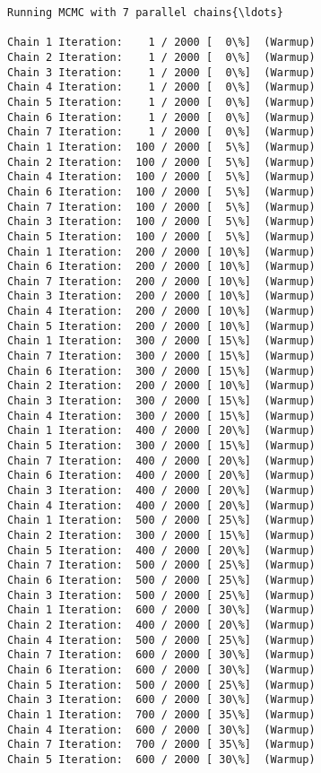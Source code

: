 \documentclass[11pt]{article}
\begin{document}
    \begin{Verbatim}[commandchars=\\\{\}]
Running MCMC with 7 parallel chains{\ldots}

Chain 1 Iteration:    1 / 2000 [  0\%]  (Warmup)
Chain 2 Iteration:    1 / 2000 [  0\%]  (Warmup)
Chain 3 Iteration:    1 / 2000 [  0\%]  (Warmup)
Chain 4 Iteration:    1 / 2000 [  0\%]  (Warmup)
Chain 5 Iteration:    1 / 2000 [  0\%]  (Warmup)
Chain 6 Iteration:    1 / 2000 [  0\%]  (Warmup)
Chain 7 Iteration:    1 / 2000 [  0\%]  (Warmup)
Chain 1 Iteration:  100 / 2000 [  5\%]  (Warmup)
Chain 2 Iteration:  100 / 2000 [  5\%]  (Warmup)
Chain 4 Iteration:  100 / 2000 [  5\%]  (Warmup)
Chain 6 Iteration:  100 / 2000 [  5\%]  (Warmup)
Chain 7 Iteration:  100 / 2000 [  5\%]  (Warmup)
Chain 3 Iteration:  100 / 2000 [  5\%]  (Warmup)
Chain 5 Iteration:  100 / 2000 [  5\%]  (Warmup)
Chain 1 Iteration:  200 / 2000 [ 10\%]  (Warmup)
Chain 6 Iteration:  200 / 2000 [ 10\%]  (Warmup)
Chain 7 Iteration:  200 / 2000 [ 10\%]  (Warmup)
Chain 3 Iteration:  200 / 2000 [ 10\%]  (Warmup)
Chain 4 Iteration:  200 / 2000 [ 10\%]  (Warmup)
Chain 5 Iteration:  200 / 2000 [ 10\%]  (Warmup)
Chain 1 Iteration:  300 / 2000 [ 15\%]  (Warmup)
Chain 7 Iteration:  300 / 2000 [ 15\%]  (Warmup)
Chain 6 Iteration:  300 / 2000 [ 15\%]  (Warmup)
Chain 2 Iteration:  200 / 2000 [ 10\%]  (Warmup)
Chain 3 Iteration:  300 / 2000 [ 15\%]  (Warmup)
Chain 4 Iteration:  300 / 2000 [ 15\%]  (Warmup)
Chain 1 Iteration:  400 / 2000 [ 20\%]  (Warmup)
Chain 5 Iteration:  300 / 2000 [ 15\%]  (Warmup)
Chain 7 Iteration:  400 / 2000 [ 20\%]  (Warmup)
Chain 6 Iteration:  400 / 2000 [ 20\%]  (Warmup)
Chain 3 Iteration:  400 / 2000 [ 20\%]  (Warmup)
Chain 4 Iteration:  400 / 2000 [ 20\%]  (Warmup)
Chain 1 Iteration:  500 / 2000 [ 25\%]  (Warmup)
Chain 2 Iteration:  300 / 2000 [ 15\%]  (Warmup)
Chain 5 Iteration:  400 / 2000 [ 20\%]  (Warmup)
Chain 7 Iteration:  500 / 2000 [ 25\%]  (Warmup)
Chain 6 Iteration:  500 / 2000 [ 25\%]  (Warmup)
Chain 3 Iteration:  500 / 2000 [ 25\%]  (Warmup)
Chain 1 Iteration:  600 / 2000 [ 30\%]  (Warmup)
Chain 2 Iteration:  400 / 2000 [ 20\%]  (Warmup)
Chain 4 Iteration:  500 / 2000 [ 25\%]  (Warmup)
Chain 7 Iteration:  600 / 2000 [ 30\%]  (Warmup)
Chain 6 Iteration:  600 / 2000 [ 30\%]  (Warmup)
Chain 5 Iteration:  500 / 2000 [ 25\%]  (Warmup)
Chain 3 Iteration:  600 / 2000 [ 30\%]  (Warmup)
Chain 1 Iteration:  700 / 2000 [ 35\%]  (Warmup)
Chain 4 Iteration:  600 / 2000 [ 30\%]  (Warmup)
Chain 7 Iteration:  700 / 2000 [ 35\%]  (Warmup)
Chain 5 Iteration:  600 / 2000 [ 30\%]  (Warmup)

\end{Verbatim}
\end{document}
